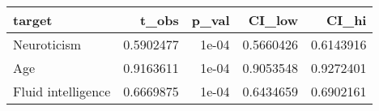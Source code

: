 
\begin{tabular}{l|r|r|r|r}
\hline
target & t\_obs & p\_val & CI\_low & CI\_hi\\
\hline
Neuroticism & 0.5902477 & 1e-04 & 0.5660426 & 0.6143916\\
\hline
Age & 0.9163611 & 1e-04 & 0.9053548 & 0.9272401\\
\hline
Fluid intelligence & 0.6669875 & 1e-04 & 0.6434659 & 0.6902161\\
\hline
\end{tabular}
